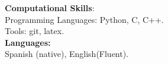 \documentclass[letterpaper]{article}
\begin{document}
\textbf{\Large Computational Skills}:\\

\indent Programming Languages: Python, C, C++.\\
\indent Tools: git, latex.\\

\textbf{\Large Languages:}\\

\indent Spanish (native), English(Fluent).

\end{document}
